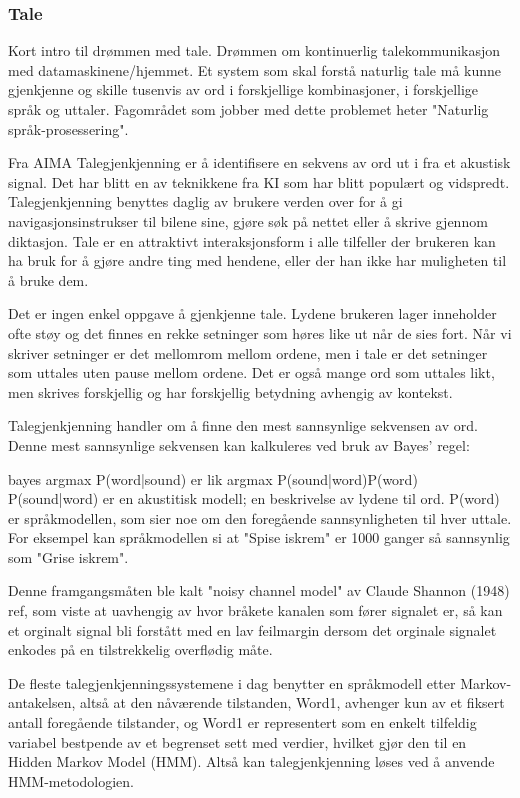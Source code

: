 {\color{blue}


\subsubsection*{Tale}
{\color{blue}
Kort intro til drømmen med tale. Drømmen om kontinuerlig talekommunikasjon med datamaskinene/hjemmet. Et system som skal forstå naturlig tale må kunne gjenkjenne og skille tusenvis av ord i forskjellige kombinasjoner, i forskjellige språk og uttaler. Fagområdet som jobber med dette problemet heter "Naturlig språk-prosessering". 

Fra AIMA
Talegjenkjenning er å identifisere en sekvens av ord ut i fra et akustisk signal. Det har blitt en av teknikkene fra KI som har blitt populært og vidspredt. Talegjenkjenning benyttes daglig av brukere verden over for å gi navigasjonsinstrukser til bilene sine, gjøre søk på nettet eller å skrive gjennom diktasjon. Tale er en attraktivt interaksjonsform i alle tilfeller der brukeren kan ha bruk for å gjøre andre ting med hendene, eller der han ikke har muligheten til å bruke dem.

Det er ingen enkel oppgave å gjenkjenne tale. Lydene brukeren lager inneholder ofte støy og det finnes en rekke setninger som høres like ut når de sies fort. Når vi skriver setninger er det mellomrom mellom ordene, men i tale er det setninger som uttales uten pause mellom ordene. Det er også mange ord som uttales likt, men skrives forskjellig og har forskjellig betydning avhengig av kontekst.

Talegjenkjenning handler om å finne den mest sannsynlige sekvensen av ord. Denne mest sannsynlige sekvensen kan kalkuleres ved bruk av Bayes' regel:

{\color{red}bayes} argmax P(word|sound) er lik argmax P(sound|word)P(word)
P(sound|word) er en akustitisk modell; en beskrivelse av lydene til ord. P(word) er språkmodellen, som sier noe om den foregående sannsynligheten til hver uttale. For eksempel kan språkmodellen si at "Spise iskrem" er 1000 ganger så sannsynlig som "Grise iskrem".

Denne framgangsmåten ble kalt "noisy channel model" av Claude Shannon (1948) {\color{red}ref}, som viste at uavhengig av hvor bråkete kanalen som fører signalet er, så kan et orginalt signal bli forstått med en lav feilmargin dersom det orginale signalet enkodes på en tilstrekkelig overflødig måte.

De fleste talegjenkjenningssystemene i dag benytter en språkmodell etter Markov-antakelsen, altså at den nåværende tilstanden, Word1, avhenger kun av et fiksert antall foregående tilstander, og Word1 er representert som en enkelt tilfeldig variabel bestpende av et begrenset sett med verdier, hvilket gjør den til en Hidden Markov Model (HMM). Altså kan talegjenkjenning løses ved å anvende HMM-metodologien.

}}
